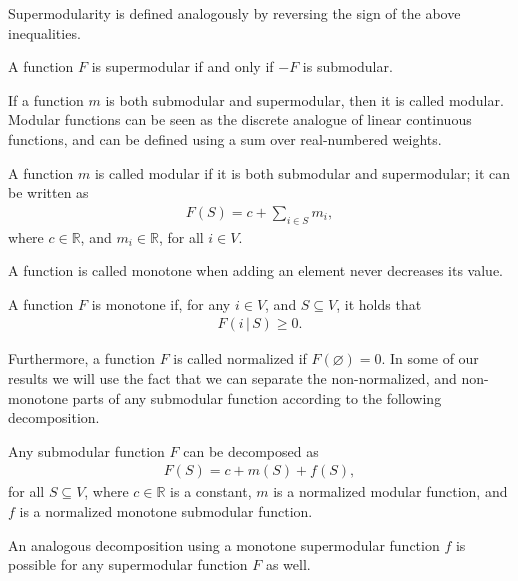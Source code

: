 Supermodularity is defined analogously by reversing the sign of the above inequalities.
\begin{definition}[Supermodularity] \label{def:supermod}
A function $F$ is supermodular if and only if $-F$ is submodular.
\end{definition}

If a function $m$ is both submodular and supermodular, then it is called modular.
Modular functions can be seen as the discrete analogue of linear continuous functions, and can be defined using a sum over real-numbered weights.
\begin{definition}[Modularity]
A function $m$ is called modular if it is both submodular and supermodular; it can be written as
\begin{align*}
F(S) = c + \sum_{i \in S} m_i,
\end{align*}
where $c \in \mathbb{R}$, and $m_i \in \mathbb{R}$, for all $i \in V$.
\end{definition}

A function is called monotone when adding an element never decreases its value.
\begin{definition}[Monotonicity]
A function $F$ is monotone if, for any $i \in V$, and $S \subseteq V$, it holds that
\begin{align*}
F(i \,|\, S) \geq 0.
\end{align*}
\end{definition}
Furthermore, a function $F$ is called normalized if $F(\varnothing) = 0$.
In some of our results we will use the fact that we can separate the non-normalized, and non-monotone parts of any submodular function according to the following decomposition.
\begin{definition} \label{def:decomp}
Any submodular function $F$ can be decomposed as
\begin{align*} %
  F(S) = c + m(S) + f(S),
\end{align*}
for all $S \subseteq V$, where $c \in \mathbb{R}$ is a constant, $m$ is a normalized modular function, and $f$ is a normalized monotone submodular function.
\end{definition}
An analogous decomposition using a monotone supermodular function $f$ is possible for any supermodular function $F$ as well.

